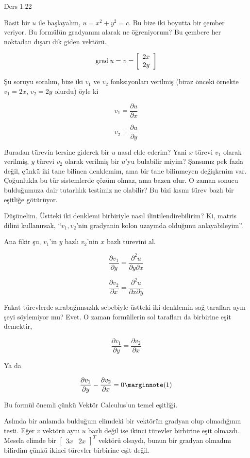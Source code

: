 \documentclass[12pt,fleqn]{article}\usepackage{../../common}
\begin{document}
Ders 1.22

Basit bir $u$ ile başlayalım, $u = x^2 + y^2 = c$. Bu bize iki boyutta bir
çember veriyor. Bu formülün gradyanını alarak ne öğreniyorum? Bu çembere her
noktadan dışarı dik giden vektörü.

$$
\operatorname{grad} u = v = \left[\begin{array}{ccc}
2x \\ 2y
\end{array}\right]
$$

Şu soruyu soralım, bize iki $v_1$ ve $v_2$ fonksiyonları verilmiş (biraz önceki
örnekte $v_1 = 2x$, $v_2 = 2y$ olurdu) öyle ki

$$
v_1 = \frac{\partial u}{\partial x}
$$

$$
v_2 = \frac{\partial u}{\partial y}
$$

Buradan türevin tersine giderek bir $u$ nasıl elde ederim? Yani $x$ türevi $v_1$
olarak verilmiş, $y$ türevi $v_2$ olarak verilmiş bir $u$'yu bulabilir miyim?
Şansımız pek fazla değil, çünkü iki tane bilinen denklemim, ama bir tane
bilinmeyen değişkenim var. Çoğunlukla bu tür sistemlerde çözüm olmaz, ama bazen
olur. O zaman sonucu bulduğumuza dair tutarlılık testimiz ne olabilir?
Bu bizi kısmı türev bazlı bir eşitliğe götürüyor.

Düşünelim. Üstteki iki denklemi birbiriyle nasıl ilintilendirebilirim? Ki,
matris dilini kullanırsak, ``$v_1,v_2$'nin gradyanin kolon uzayında olduğunu
anlayabileyim''. 

Ana fikir şu, $v_1$'in $y$ bazlı $v_2$'nin $x$ bazlı türevini al.

$$
\frac{\partial v_1}{\partial y} = \frac{\partial^2 u}{\partial y \partial x}
$$

$$
\frac{\partial v_2}{\partial x} = \frac{\partial^2 u}{\partial x \partial y}
$$

Fakat türevlerde sırabağımsızlık sebebiyle üstteki iki denklemin sağ tarafları
aynı şeyi söylemiyor mu? Evet. O zaman formüllerin sol tarafları da birbirine
eşit demektir,

$$
\frac{\partial v_1}{\partial y} = \frac{\partial v_2}{\partial x} 
$$

Ya da

$$
\frac{\partial v_1}{\partial y} - \frac{\partial v_2}{\partial x} = 0
\mlabel{1}
$$

Bu formül önemli çünkü Vektör Calculus'un temel eşitliği.

Aslında bir anlamda bulduğum elimdeki bir vektörün gradyan olup olmadığının
testi. Eğer $v$ vektörü aynı $u$ bazlı değil ise ikinci türevler birbirine
eşit olmazdı. Mesela elimde bir $[\begin{array}{cc} 3x & 2x \end{array}]^T$
vektörü olsaydı, bunun bir gradyan olmadını bilirdim çünkü ikinci türevler
birbirine eşit değil.
\end{document}

